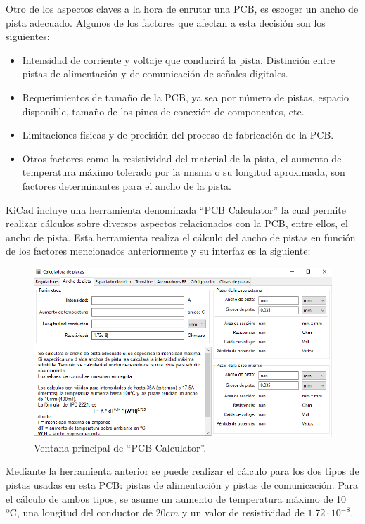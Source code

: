 Otro de los aspectos claves a la hora de enrutar una \ac{PCB}, es escoger un ancho de pista adecuado. Algunos de los factores que afectan a esta decisión son los siguientes:
\begin{itemize}
    \item Intensidad de corriente y voltaje que conducirá la pista. Distinción entre pistas de alimentación y de comunicación de señales digitales.
    \item Requerimientos de tamaño de la \ac{PCB}, ya sea por número de pistas, espacio disponible, tamaño de los pines de conexión de componentes, etc.
    \item Limitaciones físicas y de precisión del proceso de fabricación de la \ac{PCB}.
    \item Otros factores como la resistividad del material de la pista, el aumento de temperatura máximo tolerado por la misma o su longitud aproximada, son factores determinantes para el ancho de la pista.
\end{itemize}

KiCad incluye una herramienta denominada ``\ac{PCB} Calculator'' la cual permite realizar cálculos sobre diversos aspectos relacionados con la \ac{PCB}, entre ellos, el ancho de pista. Esta herramienta realiza el cálculo del ancho de pistas en función de los factores mencionados anteriormente y su interfaz es la siguiente:

\begin{figure}[H]
\centering 
\includegraphics[width=0.9\linewidth]{pictures/PCBCalculator.PNG}
\caption{Ventana principal de ``PCB Calculator''.}
\label{fig:CAMBIAR!!!!!!!!!!}
\end{figure}

Mediante la herramienta anterior se puede realizar el cálculo para los dos tipos de pistas usadas en esta \ac{PCB}: pistas de alimentación y pistas de comunicación. Para el cálculo de ambos tipos, se asume un aumento de temperatura máximo de 10 ºC, una longitud del conductor de $20cm$ y un valor de resistividad de $1.72 \cdot 10^{-8}$.

